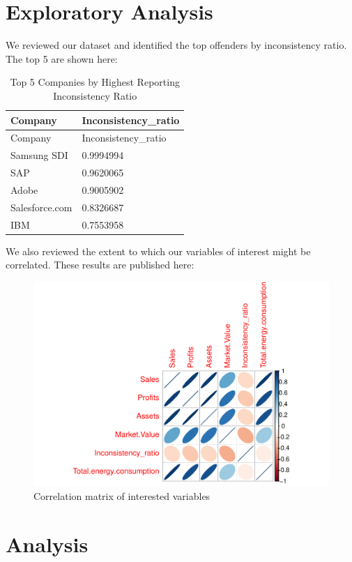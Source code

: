 \documentclass[
  12pt,
]{article}
\begin{document}
\newpage

\hypertarget{exploratory-analysis}{%
\section{Exploratory Analysis}\label{exploratory-analysis}}

We reviewed our dataset and identified the top offenders by
inconsistency ratio. The top 5 are shown here:

\begin{longtable}[]{@{}ll@{}}
\caption{Top 5 Companies by Highest Reporting Inconsistency
Ratio}\tabularnewline
\toprule
Company & Inconsistency\_ratio\tabularnewline
\midrule
\endfirsthead
\toprule
Company & Inconsistency\_ratio\tabularnewline
\midrule
\endhead
Samsung SDI & 0.9994994\tabularnewline
SAP & 0.9620065\tabularnewline
Adobe & 0.9005902\tabularnewline
Salesforce.com & 0.8326687\tabularnewline
IBM & 0.7553958\tabularnewline
\bottomrule
\end{longtable}

We also reviewed the extent to which our variables of interest might be
correlated. These results are published here:

\begin{figure}
\centering
\includegraphics{BoothProphete_Report_files/figure-latex/correlations-1.pdf}
\caption{Correlation matrix of interested variables}
\end{figure}

\newpage

\hypertarget{analysis}{%
\section{Analysis}\label{analysis}}
\end{document}

